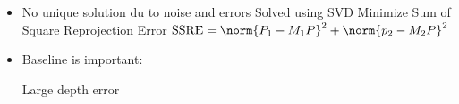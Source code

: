 \begin{itemize}
\begin{itemize*}
        \end{itemize*}
    \item No unique solution du to noise and errors
     Solved using SVD
     Minimize Sum of Square Reprojection Error $\mathrm{SSRE} = \norm{P_1 - M_1 P}^2 + \norm{p_2 - M_2 P}^2$
    \item Baseline is important:
        \begin{itemize}
             Large depth error
        \end{itemize}
\end{itemize}

